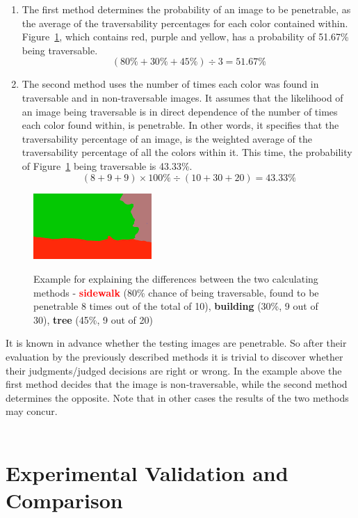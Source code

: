 \documentclass[12pt,a4paper,table,dvipsnames,tikz]{report}
\newcommand{\bl}[1]{{\hypersetup{linkcolor=blue}#1}}
\newcommand{\boldcolor}[2]{\textbf{\textcolor{#1}{#2}}}
\newcommand{\class}[1]{\textbf{\textcolor{#1}{#1}}} %
\begin{document}
	\begin{enumerate}
		\item The first method determines the probability of an image to be penetrable, 
		as the average of the traversability percentages for each color contained within.
		Figure~\bl{\ref{fig:meth}}, which contains red, purple and yellow, has a probability 
		of 51.67\% being traversable.
		\[ (80\% + 30\% + 45\%) \div 3 = 51.67\% \]
		\item The second method uses the number of times each color was found in traversable 
		and in non-traversable images. It assumes that the likelihood of an image being 
		traversable is in direct dependence of the number of times each color found within, 
		is penetrable. In other words, it specifies that the traversability percentage of 
		an image, is the weighted average of the traversability percentage of all the colors 
		within it. 
		This time, the probability of Figure~\bl{\ref{fig:meth}} being traversable is 43.33\%.
		\[ (8 + 9 + 9) \times 100\% \div (10 + 30 + 20) = 43.33\% \]
	\end{enumerate}
	
	\begin{figure}[h!]
		\caption{Example for explaining the differences between the two calculating methods - 
			\boldcolor{red}{sidewalk} (80\% chance of being traversable, found to be 
			penetrable 8 times out of the total of 10), \class{building} (30\%, 9 out of 30), 
			\class{tree} (45\%, 9 out of 20)}
		\centering
		\includegraphics[width=0.4\textwidth]{47-05_0065}
		\label{fig:meth}
	\end{figure}
	
	
	It is known in advance whether the testing images are penetrable. So after their 
	evaluation by the previously described methods it is trivial to discover whether their 
	judgments/judged decisions are right or wrong. In the example above the first method decides that the 
	image is non-traversable, while the second method determines the opposite. Note that 
	in other cases the results of the two methods may concur.
	\\\\ 
	
	
	\chapter{Experimental Validation and Comparison}
	\label{sec:exp}
	
\end{document}
